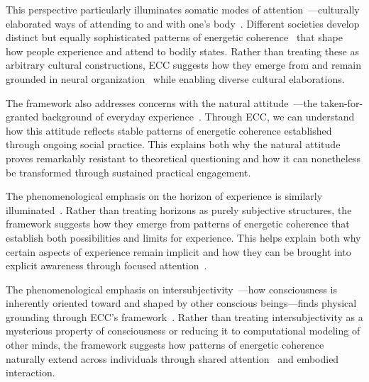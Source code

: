 This perspective particularly illuminates somatic modes of attention~—culturally elaborated ways of attending to and with one's body~\cite{csordas1993somatic,howes2003sensual}. Different societies develop distinct but equally sophisticated patterns of energetic coherence~ that shape how people experience and attend to bodily states. Rather than treating these as arbitrary cultural constructions, ECC suggests how they emerge from and remain grounded in neural organization~ while enabling diverse cultural elaborations.

The framework also addresses concerns with the natural attitude~—the taken-for-granted background of everyday experience~\cite{schutz1967phenomenology,jackson1996things}. Through ECC, we can understand how this attitude reflects stable patterns of energetic coherence established through ongoing social practice. This explains both why the natural attitude proves remarkably resistant to theoretical questioning and how it can nonetheless be transformed through sustained practical engagement.

The phenomenological emphasis on the horizon of experience is similarly illuminated~\cite{merleau2012phenomenology,ingold2011being}. Rather than treating horizons as purely subjective structures, the framework suggests how they emerge from patterns of energetic coherence that establish both possibilities and limits for experience. This helps explain both why certain aspects of experience remain implicit and how they can be brought into explicit awareness through focused attention~.

The phenomenological emphasis on intersubjectivity~—how consciousness is inherently oriented toward and shaped by other conscious beings—finds physical grounding through ECC's framework~\cite{jackson1996things,toren1999mind}. Rather than treating intersubjectivity as a mysterious property of consciousness or reducing it to computational modeling of other minds, the framework suggests how patterns of energetic coherence naturally extend across individuals through shared attention~ and embodied interaction.

